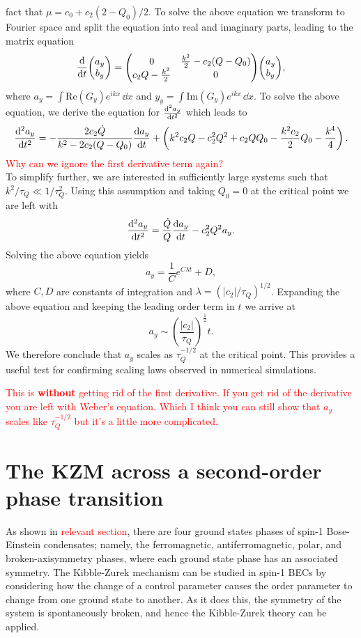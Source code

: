 fact that $\mu = c_0 + c_2(2-Q_0)/2$.
To solve the above equation we transform to Fourier space and split the equation
into real and imaginary parts, leading to the matrix equation
\begin{equation}
    \dv{t} \mqty(a_y \\ b_y) = \mqty(0 & \frac{k^2}{2}-c_2(Q-Q_0) \\
                                     c_2Q - \frac{k^2}{2} & 0)
                                \mqty(a_y \\ b_y),
\end{equation}
where $a_y = \int \mathrm{Re}(G_y)e^{ikx} \, \dd x$ and
$y_y = \int \mathrm{Im}(G_y)e^{ikx} \, \dd x$.
To solve the above equation, we derive the equation for $\dv[2]{a_y}{t}$
which leads to
\begin{equation}
    \dv[2]{a_y}{t} = -\frac{2c_2\dot{Q}}{k^2 - 2c_2(Q-Q_0)}\dv{a_y}{t} 
    + \left(k^2c_2Q - c_2^2Q^2 + c_2QQ_0 - \frac{k^2c_2}{2}Q_0 
    - \frac{k^4}{4}\right).
\end{equation}
\textcolor{red}{Why can we ignore the first derivative term again?}\\
To simplify further, we are interested in sufficiently large systems such that
$k^2/\tau_Q \ll 1 / \tau_Q^2$.
Using this assumption and taking $Q_0=0$ at the critical point we are left with
\begin{equation}
    \dv[2]{a_y}{t} = \frac{\dot{Q}}{Q}\dv{a_y}{t} - c_2^2Q^2a_y.
\end{equation}
Solving the above equation yields
\begin{equation}
    a_y = \frac{1}{C}e^{C\lambda t} + D,
\end{equation}
where $C, D$ are constants of integration and $\lambda =(|c_2|/\tau_Q)^{1/2}$.
Expanding the above equation and keeping the leading order term in $t$ we
arrive at
\begin{equation}
    a_y \sim \left(\frac{|c_2|}{\tau_Q}\right)^{\frac{1}{2}}t.
\end{equation}
We therefore conclude that $a_y$ scales as $\tau_Q^{-1/2}$ at the critical
point.
This provides a useful test for confirming scaling laws observed in numerical
simulations.

\textcolor{red}{This is {\bf without} getting rid of the first derivative.
If you get rid of the derivative you are left with Weber's equation. Which
I think you can still show that $a_y$ scales like $\tau_Q^{-1/2}$ but it's a
little more complicated.}

\section{The KZM across a second-order phase transition}
As shown in \textcolor{red}{relevant section}, there are four ground states
phases of spin-1 Bose-Einstein condensates; namely, the ferromagnetic,
antiferromagnetic, polar, and broken-axisymmetry phases, where each ground
state phase has an associated symmetry.
The Kibble-Zurek mechanism can be studied in spin-1 BECs by considering how
the change of a control parameter causes the order parameter to change from 
one ground state to another.
As it does this, the symmetry of the system is spontaneously broken, and hence
the Kibble-Zurek theory can be applied.

